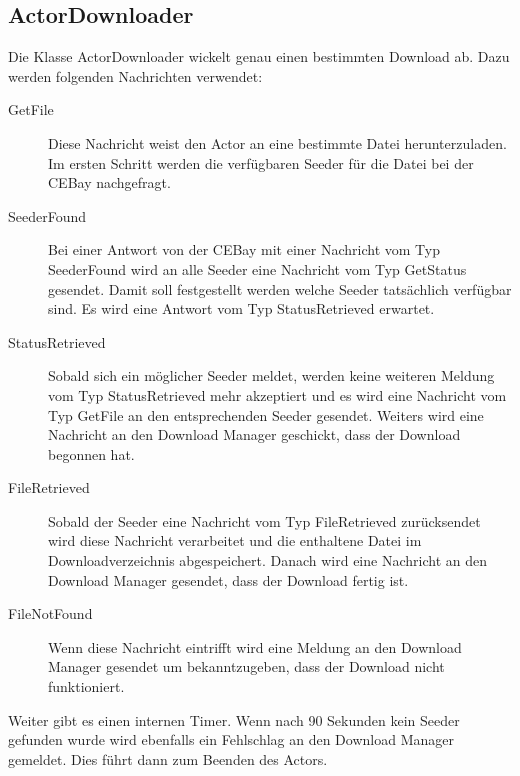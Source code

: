 \documentclass{scrartcl}
\begin{document}
\subsection{ActorDownloader}
\label{sec:orge27889b}
Die Klasse ActorDownloader wickelt genau einen bestimmten Download
ab. Dazu werden folgenden Nachrichten verwendet:
\begin{description}
\item[{GetFile}] Diese Nachricht weist den Actor an eine bestimmte Datei
herunterzuladen. Im ersten Schritt werden die verfügbaren Seeder
für die Datei bei der CEBay nachgefragt.
\item[{SeederFound}] Bei einer Antwort von der CEBay mit einer Nachricht
vom Typ SeederFound wird an alle Seeder eine Nachricht vom Typ
GetStatus gesendet. Damit soll festgestellt werden welche Seeder
tatsächlich verfügbar sind. Es wird eine Antwort vom Typ
StatusRetrieved erwartet.
\item[{StatusRetrieved}] Sobald sich ein möglicher Seeder meldet, werden
keine weiteren Meldung vom Typ StatusRetrieved mehr akzeptiert
und es wird eine Nachricht vom Typ GetFile an den entsprechenden
Seeder gesendet. Weiters wird eine Nachricht an den Download
Manager geschickt, dass der Download begonnen hat.
\item[{FileRetrieved}] Sobald der Seeder eine Nachricht vom Typ
FileRetrieved zurücksendet wird diese Nachricht verarbeitet und
die enthaltene Datei im Downloadverzeichnis abgespeichert. Danach
wird eine Nachricht an den Download Manager gesendet, dass der
Download fertig ist.
\item[{FileNotFound}] Wenn diese Nachricht eintrifft wird eine Meldung an
den Download Manager gesendet um bekanntzugeben, dass der
Download nicht funktioniert.
\end{description}

Weiter gibt es einen internen Timer. Wenn nach 90 Sekunden kein
Seeder gefunden wurde wird ebenfalls ein Fehlschlag an den Download
Manager gemeldet. Dies führt dann zum Beenden des Actors.

\newpage
\end{document}
